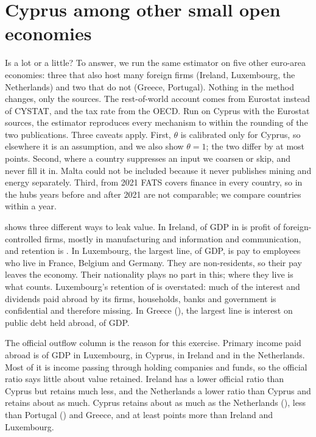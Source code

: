 \documentclass[11pt]{article}
\begin{document}
\section{Cyprus among other small open economies}
\label{sec:compare}

Is \DVRLast{} a lot or a little?
To answer, we run the same estimator on five other euro-area economies: three that also host many foreign firms (Ireland, Luxembourg, the Netherlands) and two that do not (Greece, Portugal).
Nothing in the method changes, only the sources.
The rest-of-world account comes from Eurostat instead of CYSTAT, and the tax rate from the OECD.
Run on Cyprus with the Eurostat sources, the estimator reproduces every mechanism to within the rounding of the two publications.
Three caveats apply.
First, $\theta$ is calibrated only for Cyprus, so elsewhere it is an assumption, and we also show $\theta=1$; the two differ by at most \CmpThetaMaxGap{} points.
Second, where a country suppresses an input we coarsen or skip, and never fill it in.
Malta could not be included because it never publishes mining and energy separately.
Third, from 2021 FATS covers finance in every country, so in the hubs years before and after 2021 are not comparable; we compare countries within a year.



 shows three different ways to leak value.
In Ireland, \CmpIEProfit{} of GDP in \CmpYear{} is profit of foreign-controlled firms, mostly in manufacturing and information and communication, and retention is \CmpIE.
In Luxembourg, the largest line, \CmpLUCommuters{} of GDP, is pay to employees who live in France, Belgium and Germany.
They are non-residents, so their pay leaves the economy.
Their nationality plays no part in this; where they live is what counts.
Luxembourg's retention of \CmpLU{} is overstated: much of the interest and dividends paid abroad by its firms, households, banks and government is confidential and therefore missing.
In Greece (\CmpEL), the largest line is interest on public debt held abroad, \CmpELPublic{} of GDP.

The official outflow column is the reason for this exercise.
Primary income paid abroad is \CmpLUOfficial{} of GDP in Luxembourg, \OfficialOutLast{} in Cyprus, \CmpIEOfficial{} in Ireland and \CmpNLOfficial{} in the Netherlands.
Most of it is income passing through holding companies and funds, so the official ratio says little about value retained.
Ireland has a lower official ratio than Cyprus but retains much less, and the Netherlands a lower ratio than Cyprus and retains about as much.
Cyprus retains about as much as the Netherlands (\CmpNL), less than Portugal (\CmpPT) and Greece, and at least \CmpHubGap{} points more than Ireland and Luxembourg.
\end{document}
